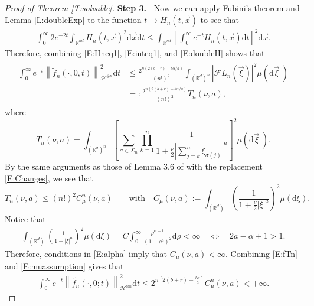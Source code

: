 \documentclass[12pt]{report}
\theoremstyle{plain}
\theoremstyle{definition}
\numberwithin{equation}{section}
\newcommand{\R}{\mathbb{R}}
\newcommand{\Norm}[1]{\left\|  #1   \right\|}
\newcommand{\ud}{\ensuremath{ \mathrm{d} }}
\begin{document}
\begin{proof}[Proof of Theorem \ref{T:solvable}]
	{\bigskip\bf\noindent Step 3.~}%
	Now we can apply Fubini's theorem and Lemma \ref{L:doubleExp} to the function $t\to
	H_n(t,\vec{x})$ to see that
	\begin{align} \label{E:doubleH}
	\int_0^\infty 2e^{-2t} \int_{\R^{nd}} H_n(t,\vec{x})^2 \ud \vec{x} \ud t
	\le \int_{\R^{nd}} \left[ \int_0^\infty e^{-t} H_n(t,\vec{x}) \ud t\right ]^2 \ud \vec{x}.
	\end{align}
	Therefore, combining \eqref{E:Hneq1}, \eqref{E:inteq1}, and \eqref{E:doubleH} shows that
	\begin{align} \label{E:fTn}
	\begin{aligned}
	\int_0^\infty e^{-t} \Norm{ \widetilde{f}_n(\cdot,0,t) }_{\mathcal{H}^{\otimes n}}^2 \ud t
	& \le \frac{2^{n(2(b+r) - b\alpha/a)}}{(n!)^2} \int_{(\R^d)^n} | \mathcal{F}L_n(\vec{\xi}) |^2 \mu(\ud \vec{\xi}\:) \\
	& =: \frac{2^{n(2(b+r) - b\alpha/a)}}{(n!)^2} T_n(\nu,a),
	\end{aligned}
	\end{align}
	where
	\begin{equation} \label{E:Tn}
	T_n(\nu,a) = \int_{(\R^d)^n} \left[\sum_{\sigma \in \Sigma_n} \prod_{k=1}^n \frac{1}{1+\frac{\nu}{2}\left|\sum_{j=k}^n \xi_{\sigma(j)} \right|^a}\right]^2 \mu(\ud \vec{\xi}\:).
	\end{equation}
	By the same arguments as those of Lemma 3.6 of \cite{balan.chen.ea:22:exact} with the replacement
	\eqref{E:Changes}, we see that
	\begin{equation} \label{E:muassumption}
	T_n(\nu, a) \le (n!)^2 C_\mu^n(\nu, a)
	\qquad \text{with} \quad
	C_\mu(\nu,a) := \int_{(\R^d)} \left(\frac{1}{1+\frac{\nu}{2}|\xi|^a}\right)^2 \mu(\ud \xi).
	\end{equation}
	Notice that
	\begin{align}
	\label{E:alpha2}
	\int_{(\R^d)} \left(\frac{1}{1+|\xi|^a}\right)^2 \mu(\ud \xi)
	= C \int_0^\infty \frac{\rho^{\alpha-1}}{(1+\rho^{a})^2} \ud \rho<\infty
	\quad \Longleftrightarrow \quad
	2a - \alpha +1 > 1.
	\end{align}
	Therefore, conditions in \eqref{E:alpha} imply that $C_{\mu}(\nu,a)<\infty$.
	Combining \eqref{E:fTn} and \eqref{E:muassumption} gives that
	\begin{align} \label{E:LNfnineq}
	\int_0^\infty e^{-t} \Norm{\widetilde{f_n}(\cdot,0;t)}_{ \mathcal{H}^{ \otimes n } }^2 \ud t
	\le 2^{n\left[2(b+r)-\frac{b\alpha}{a}\right]} C_\mu^n(\nu,a)<+\infty.
	\end{align}
	

\end{proof}
\end{document}
